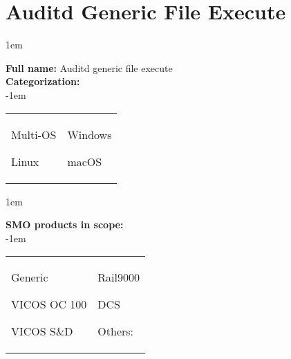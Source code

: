 
%
%

\section{Auditd Generic File Execute}
\label{15652}

\openup 1em

\textbf{Full name:} Auditd generic file execute\hrulefill \\
{\bf Categorization:} \\

\openup -1em
\vspace{-3em}

\begin{tabular}{p{}p{}}

\begin{todolist}
  	\item Multi-OS
	\item[\done] Linux
\end{todolist}
&
\begin{todolist}
	\item Windows
	\item macOS
\end{todolist}

\end{tabular}

\openup 1em

{\bf SMO products in scope:} \\

\openup -1em
\vspace{-3em}

\begin{tabular}{p{}p{}}

\begin{todolist}
  \item[\done] Generic
  \item VICOS OC 100
  \item VICOS S\&D
\end{todolist}
&
\begin{todolist}
  \item Rail9000
  \item DCS
  \item Others: \hrulefill
\end{todolist}

\end{tabular}

